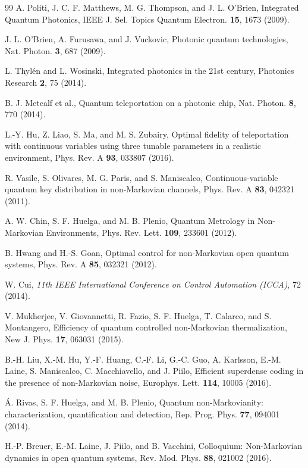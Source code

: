 \documentclass[prl,twocolumn,aps,floatfix,showpacs,tightenlines,superscriptaddress,amsmath,amssymb,amsfonts,10pt]{revtex4-1}
\begin{document}
\begin{thebibliography}{99}
A. Politi, J. C. F. Matthews, M. G. Thompson, and J. L. O’Brien,  Integrated Quantum Photonics, IEEE J. Sel. Topics Quantum Electron. {\bf 15}, 1673 (2009).

J. L. O'Brien, A. Furusawa, and J. Vuckovic, Photonic quantum technologies, Nat. Photon. {\bf 3}, 687 (2009).

L. Thyl\'{e}n and L. Wosinski, Integrated photonics in the 21st century, Photonics Research {\bf 2}, 75 (2014).

B. J. Metcalf et al., Quantum teleportation on a photonic chip, Nat. Photon. {\bf 8}, 770 (2014).

L.-Y. Hu, Z. Liao, S. Ma, and M. S. Zubairy, Optimal fidelity of teleportation with continuous variables using three tunable parameters in a realistic environment, Phys. Rev. A {\bf 93}, 033807 (2016).

R. Vasile, S. Olivares, M. G. Paris, and S. Maniscalco, Continuous-variable quantum key distribution in non-Markovian channels, Phys. Rev. A {\bf 83}, 042321 (2011).

A. W. Chin, S. F. Huelga, and M. B. Plenio, Quantum Metrology in Non-Markovian Environments, Phys. Rev. Lett. {\bf 109}, 233601 (2012).

B. Hwang and H.-S. Goan, Optimal control for non-Markovian open quantum systems, Phys. Rev. A {\bf 85}, 032321 (2012).

W. Cui, \textit{11th IEEE International Conference on Control Automation (ICCA)}, 72 (2014).

V. Mukherjee, V. Giovannetti, R. Fazio, S. F. Huelga, T. Calarco, and S. Montangero, Efficiency of quantum controlled non-Markovian thermalization, New J. Phys. {\bf 17}, 063031 (2015).

B.-H. Liu, X.-M. Hu, Y.-F. Huang, C.-F. Li, G.-C. Guo, A. Karlsson, E.-M. Laine, S. Maniscalco, C. Macchiavello, and J. Piilo, Efficient superdense coding in the presence of non-Markovian noise, Europhys. Lett. {\bf 114}, 10005 (2016).

\'{A}. Rivas, S. F. Huelga, and M. B. Plenio, Quantum non-Markovianity: characterization, quantification and detection, Rep. Prog. Phys. {\bf 77}, 094001 (2014).

H.-P. Breuer, E.-M. Laine, J. Piilo, and B. Vacchini, Colloquium: Non-Markovian dynamics in open quantum systems, Rev. Mod. Phys. {\bf 88}, 021002 (2016).


\end{thebibliography}
\end{document}

